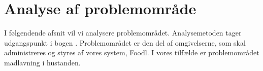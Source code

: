 \chapter{Analyse af problemområde}
\label{chap:analyseafpo}

I følgendende afsnit vil vi analysere problemområdet. Analysemetoden tager udgangspunkt i bogen \cite[s. ~43]{ooad}. Problemområdet er den del af omgivelserne, som skal administreres og styres af vores system, Foodl. I vores tilfælde er problemområdet madlavning i hustanden. 

 

